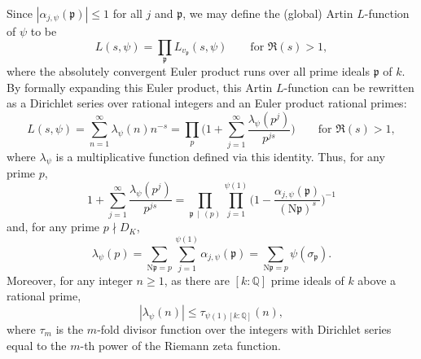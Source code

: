 \documentclass[12pt]{amsart}
\theoremstyle{definition} \newtheorem{definition}[theorem]{Definition}
\theoremstyle{example} \newtheorem{example}[theorem]{Example}
\theoremstyle{remark} \newtheorem{remark}{Remark}[theorem]
\numberwithin{equation}{section}
\numberwithin{theorem}{section}
\renewcommand{\leq}{\leqslant}
\renewcommand{\geq}{\geqslant}
\newcommand{\N}{\mathrm{N}} %
\newcommand{\Q}{\mathbb{Q}}
\newcommand{\kp}{\mathfrak{p}}
\begin{document}
Since $|\alpha_{j,\psi}(\kp)|\leq 1$ for all $j$ and $\kp$, we may define the (global) Artin $L$-function of $\psi$ to be 
\begin{equation}
	\label{eqn:Artin-EulerProduct}
L(s,\psi) = \prod_{\kp}L_{v_{\kp}}(s,{\psi})
\qquad \text{for } \Re(s) > 1,
\end{equation}
where the absolutely convergent Euler product runs over all prime ideals $\mathfrak{p}$ of $k$. By formally expanding this Euler product, this Artin $L$-function can be rewritten as a Dirichlet series over rational integers and an Euler product rational primes: 
\begin{equation}
	\label{eqn:Artin-RationalEulerProduct}
L(s,\psi) = \sum_{n=1}^{\infty} \lambda_\psi(n) n^{-s} = \prod_p \Big(1 + \sum_{j=1}^{\infty} \frac{\lambda_\psi(p^j)}{p^{js}} \Big) \qquad \text{for } \Re(s) > 1, 
\end{equation}
where $\lambda_{\psi}$ is a multiplicative function defined via this identity. Thus, for any prime $p$, 
\begin{equation} \label{eqn:Artin-LocalFactorComparison}
1 + \sum_{j=1}^{\infty} \frac{\lambda_\psi(p^j)}{p^{js}} = \prod_{\kp \, \mid \, (p)} \prod_{j=1}^{\psi(1)} \Big(1 - \frac{\alpha_{j,\psi}(\mathfrak{p})}{(\mathrm{N}\mathfrak{p})^s} \Big)^{-1}
\end{equation}
and, for any prime $p \nmid D_K$, 
\begin{equation} \label{eqn:Artin-PrimeCoefficient}
\lambda_{\psi}(p) = \sum_{\N\kp = p} \sum_{j=1}^{\psi(1)} \alpha_{j,\psi}(\kp)  = \sum_{\N\kp = p} \psi(\sigma_{\kp}). 
\end{equation}
Moreover, for any integer $n \geq 1$,  as there are $[k:\Q]$ prime ideals of $k$ above a rational prime, 
\begin{equation} \label{eqn:Artin-DivisorBound}
|\lambda_\psi(n)| \leq \tau_{\psi(1) [k:\mathbb{Q}]}(n),
\end{equation}
where $\tau_{m}$ is the $m$-fold divisor function over the integers with Dirichlet series equal to the $m$-th power of the Riemann zeta function.
\end{document}
